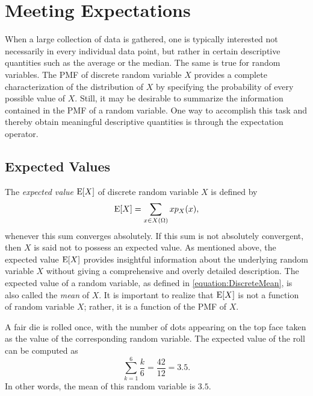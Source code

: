 \chapter{Meeting Expectations}
\label{chapter:ExpectationsDiscrete}

When a large collection of data is gathered, one is typically interested not necessarily in every individual data point, but rather in certain descriptive quantities such as the average or the median.
The same is true for random variables.
The PMF of discrete random variable $X$ provides a complete characterization of the distribution of $X$ by specifying the probability of every possible value of $X$.
Still, it may be desirable to summarize the information contained in the PMF of a random variable.
One way to accomplish this task and thereby obtain meaningful descriptive quantities is through the expectation operator.


\section{Expected Values}

The \emph{expected value} $\mathrm{E} [X]$ of discrete random variable $X$ is defined by 
\begin{equation} \label{equation:DiscreteMean}
\mathrm{E} [X] = \sum_{x \in X(\Omega)} x p_X (x) ,
\end{equation}
whenever this sum converges absolutely.
If this sum is not absolutely convergent, then $X$ is said not to possess an expected value.
As mentioned above, the expected value $\mathrm{E} [X]$ provides insightful information about the underlying random variable $X$ without giving a comprehensive and overly detailed description.
The expected value of a random variable, as defined in \eqref{equation:DiscreteMean}, is also called the \emph{mean} of $X$. 
It is important to realize that $\mathrm{E} [X]$ is not a function of random variable $X$; rather, it is a function of the PMF of $X$.

\begin{example}
A fair die is rolled once, with the number of dots appearing on the top face taken as the value of the corresponding random variable.
The expected value of the roll can be computed as
\begin{equation*}
\sum_{k=1}^6 \frac{k}{6} = \frac{42}{12} = 3.5 .
\end{equation*}
In other words, the mean of this random variable is $3.5$.
\end{example}

